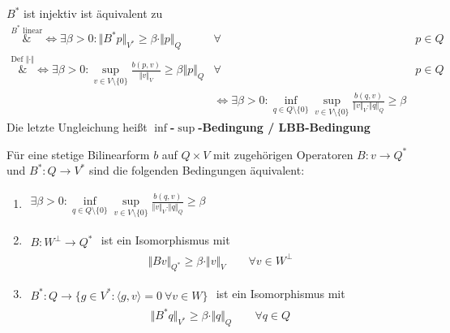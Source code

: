 $B^\ast$ ist injektiv ist äquivalent zu
\begin{align*}
	\overset{B^\ast\text{ linear}}&{\Longleftrightarrow}
	\exists\beta>0:\big\Vert B^\ast p\big\Vert_{V^\ast}\geq\beta\cdot\Vert p\Vert_Q &\forall& p\in Q\\
	\overset{\text{Def }\Vert\cdot\Vert}&\Longleftrightarrow \exists\beta>0:
	\sup\limits_{v\in V\setminus\lbrace0\rbrace}\frac{b(p,v)}{\Vert v\Vert_V}\geq\beta\Vert p\Vert_Q &\forall&p\in Q\\
	&\Longleftrightarrow\exists\beta>0:
	\inf\limits_{q\in Q\setminus\lbrace0\rbrace}\sup\limits_{v\in V\setminus\lbrace0\rbrace}\frac{b(q,v)}{\Vert v\Vert_V\cdot\Vert q\Vert_Q}\geq\beta
\end{align*}
Die letzte Ungleichung heißt \textbf{$\inf$-$\sup$-Bedingung / LBB-Bedingung}
\setcounter{satz}{-1}
\begin{satz}\label{theorem8.0infsupAequivalenz}%
	Für eine stetige Bilinearform $b$ auf $Q\times V$ mit zugehörigen Operatoren
	$B\colon v\to Q^\ast$ und $B^\ast\colon Q\to V^\ast$ sind die folgenden Bedingungen äquivalent:
	\begin{enumerate}[label=(\roman*)]
		\item $\begin{aligned}
			\exists\beta>0:\inf\limits_{q\in Q\setminus\lbrace0\rbrace}\sup\limits_{v\in V\setminus\lbrace 0\rbrace}\frac{b(q,v)}{\Vert v\Vert_V\cdot\Vert q\Vert_Q}\geq\beta
		\end{aligned}$
		\item $\begin{aligned}
			B\colon W^\perp\to Q^\ast
		\end{aligned}$ ist ein Isomorphismus mit 
		\begin{align*}
			\Vert B v\Vert_{Q^\ast}\geq\beta\cdot\Vert v\Vert_V\qquad\forall v\in W^\perp
		\end{align*}
		\item $\begin{aligned}
			B^\ast\colon Q\to\big\lbrace g\in V^\ast:\langle g,v\rangle=0~\forall v\in W\big\rbrace
		\end{aligned}$ ist ein Isomorphismus mit
		\begin{align*}
			\big\Vert B^\ast q\big\Vert_{V^\ast}\geq\beta\cdot\Vert q\Vert_Q\qquad\forall q\in Q
		\end{align*}
	\end{enumerate}
\end{satz}

